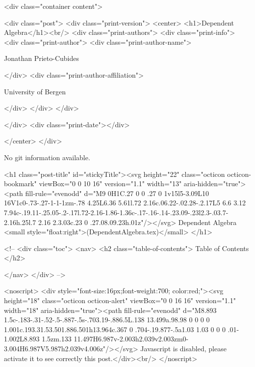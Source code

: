       <div class="container content">
        







<div class="post">
  <div class="print-version">
    <center>
      <h1>Dependent Algebra</h1><br/>
        <div class="print-authors">
          <div class="print-info">
            <div class="print-author">
              <div class="print-author-name">
                
                  Jonathan Prieto-Cubides
                
              </div>
              <div class="print-author-affiliation">
                
                  University of Bergen
                
                </div>
            </div>
          </div>
          
          
        </div>
        <div class="print-date"></div>
        
        
    </center>
  </div>

  
  No git information available.
  

  <h1 class="post-title" id="stickyTitle"><svg height="22" class="octicon octicon-bookmark" viewBox="0 0 10 16" version="1.1" width="13" aria-hidden="true"><path fill-rule="evenodd" d="M9 0H1C.27 0 0 .27 0 1v15l5-3.09L10 16V1c0-.73-.27-1-1-1zm-.78 4.25L6.36 5.61l.72 2.16c.06.22-.02.28-.2.17L5 6.6 3.12 7.94c-.19.11-.25.05-.2-.17l.72-2.16-1.86-1.36c-.17-.16-.14-.23.09-.23l2.3-.03.7-2.16h.25l.7 2.16 2.3.03c.23 0 .27.08.09.23h.01z"/></svg> Dependent Algebra <small style="float:right">(DependentAlgebra.tex)</small>
  </h1>

  <!-- 
  <div class="toc">
    <nav>
    <h2 class="table-of-contents"> Table of Contents </h2>
      

    </nav>
  </div>
   -->

  <noscript>
  <div style="font-size:16px;font-weight:700; color:red;"><svg height="18" class="octicon octicon-alert" viewBox="0 0 16 16" version="1.1" width="18" aria-hidden="true"><path fill-rule="evenodd" d="M8.893 1.5c-.183-.31-.52-.5-.887-.5s-.703.19-.886.5L.138 13.499a.98.98 0 0 0 0 1.001c.193.31.53.501.886.501h13.964c.367 0 .704-.19.877-.5a1.03 1.03 0 0 0 .01-1.002L8.893 1.5zm.133 11.497H6.987v-2.003h2.039v2.003zm0-3.004H6.987V5.987h2.039v4.006z"/></svg> Javascript is disabled, please activate it to see correctly this post.</div><br/>
  </noscript>

